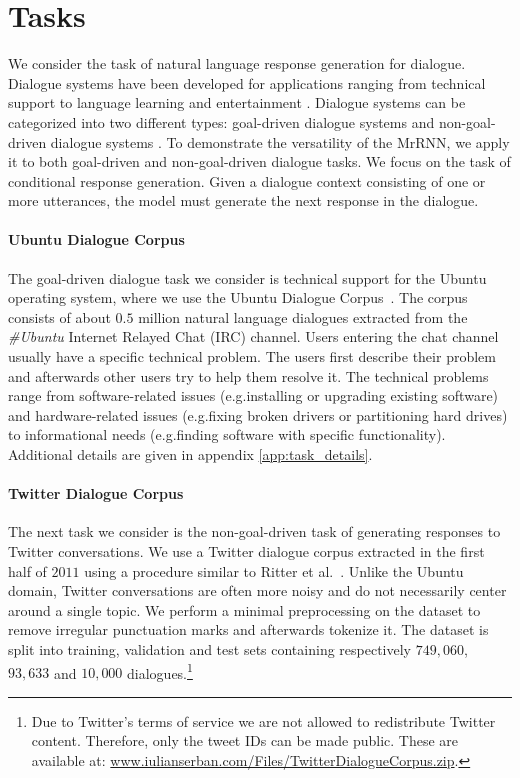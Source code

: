 \documentclass{article}
\begin{document}
\section{Tasks}
We consider the task of natural language response generation for dialogue.
Dialogue systems have been developed for applications ranging from technical support to language learning and entertainment \cite{young2013pomdp,shawar2007chatbots}. 
Dialogue systems can be categorized into two different types: goal-driven dialogue systems
and non-goal-driven dialogue systems 
\cite{DBLP:journals/corr/SerbanLCP15}.
To demonstrate the versatility of the MrRNN, we apply it to both goal-driven and non-goal-driven dialogue tasks.
We focus on the task of conditional response generation.
Given a dialogue context consisting of one or more utterances, the model must generate the next response in the dialogue.




\paragraph{Ubuntu Dialogue Corpus}


The goal-driven dialogue task we consider is technical support for the Ubuntu operating system, where we use the Ubuntu Dialogue Corpus~\cite{lowe2015ubuntu}.
The corpus consists of about $0.5$ million natural language dialogues extracted from the \textit{\#Ubuntu} Internet Relayed Chat (IRC) channel.
Users entering the chat channel usually have a specific technical problem. The users first describe their problem and afterwards other users try to help them resolve it.
The technical problems range from software-related issues (e.g.\@ installing or upgrading existing software) and hardware-related issues (e.g.\@ fixing broken drivers or partitioning hard drives) to informational needs (e.g.\@ finding software with specific functionality).
Additional details are given in appendix \ref{app:task_details}.

\paragraph{Twitter Dialogue Corpus}

The next task we consider is the non-goal-driven task of generating responses to Twitter conversations.
We use a Twitter dialogue corpus extracted in the first half of $2011$ using a procedure similar to Ritter et al.~\cite{ritter2011data}.
Unlike the Ubuntu domain,
Twitter conversations are often more noisy and do not necessarily center around a single topic.
We perform a minimal preprocessing on the dataset to remove irregular punctuation marks and afterwards tokenize it.
The dataset is split into training, validation and test sets
containing respectively $749,060$, $93,633$ and $10,000$ dialogues.\footnote{Due to Twitter's terms of service we are not allowed to redistribute Twitter content. Therefore, only the tweet IDs can be made public. These are available at: \url{www.iulianserban.com/Files/TwitterDialogueCorpus.zip}.}
\end{document}

